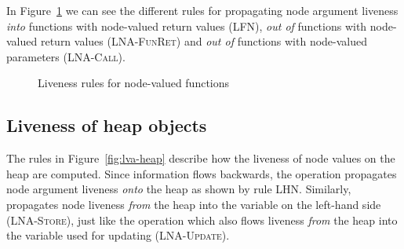 \documentclass[main.tex]{subfiles}
\begin{document}
	In Figure~\ref{fig:lva-function} we can see the different rules for propagating node argument liveness \emph{into} functions with node-valued return values (\textsc{LFN}), \emph{out of} functions with node-valued return values (\textsc{LNA-FunRet}) and \emph{out of} functions with node-valued parameters (\textsc{LNA-Call}).

  \begin{figure}[h]
  \caption{Liveness rules for node-valued functions}
  \label{fig:lva-function}
  \end{figure}

	\subsection{Liveness of heap objects}
	
	The rules in Figure~\ref{fig:lva-heap} describe how the liveness of node values on the heap are computed. Since information flows backwards, the  operation propagates node argument liveness \emph{onto} the heap as shown by rule \textsc{LHN}. Similarly,  propagates node liveness \emph{from} the heap into the variable on the left-hand side (\textsc{LNA-Store}), just like the  operation which also flows liveness \emph{from} the heap into the variable used for updating (\textsc{LNA-Update}).
	
\end{document}
